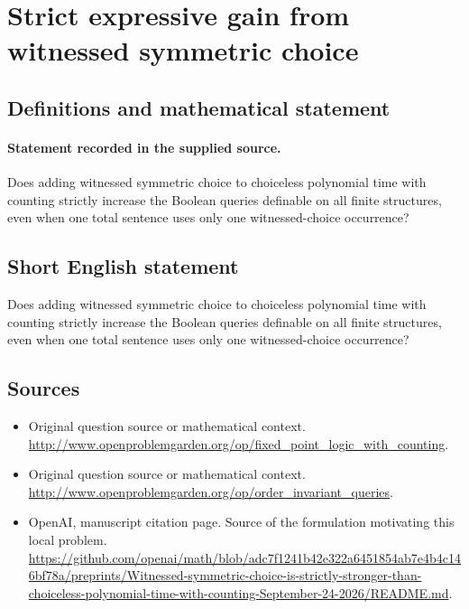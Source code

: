 \documentclass[11pt]{article}
\begin{document}
\section*{Strict expressive gain from witnessed symmetric choice}\label{statement}
\subsection{Definitions and mathematical statement}
\paragraph{Statement recorded in the supplied source.}
Does adding witnessed symmetric choice to choiceless polynomial time with counting strictly increase the Boolean queries definable on all finite structures, even when one total sentence uses only one witnessed-choice occurrence?
\subsection{Short English statement}
Does adding witnessed symmetric choice to choiceless polynomial time with counting strictly increase the Boolean queries definable on all finite structures, even when one total sentence uses only one witnessed-choice occurrence?
\subsection{Sources}
\begin{itemize}
\item[S1] Original question source or mathematical context.
\url{http://www.openproblemgarden.org/op/fixed_point_logic_with_counting}.
\item[S2] Original question source or mathematical context.
\url{http://www.openproblemgarden.org/op/order_invariant_queries}.
\item[S3] OpenAI, manuscript citation page. Source of the formulation motivating this local problem.
\url{https://github.com/openai/math/blob/adc7f1241b42e322a6451854ab7e4b4c146bf78a/preprints/Witnessed-symmetric-choice-is-strictly-stronger-than-choiceless-polynomial-time-with-counting-September-24-2026/README.md}.
\end{itemize}
\end{document}
